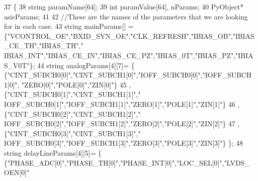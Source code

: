 \begin{DoxyCode}
37 \{
38     \textcolor{keywordtype}{string} paramName[64];
39     \textcolor{keywordtype}{int} paramValue[64], nParams;
40     PyObject* asicParams;
41  
42     \textcolor{comment}{//These are the names of the parameters that we are looking for in each case.}
43     \textcolor{keywordtype}{string} mainParams[] = \{\textcolor{stringliteral}{"VCONTROL\_OE"},\textcolor{stringliteral}{"BXID\_SYN\_OE"},\textcolor{stringliteral}{"CLK\_REFRESH"},\textcolor{stringliteral}{"IBIAS\_OB"},\textcolor{stringliteral}{"IBIAS\_CE\_TH"},\textcolor{stringliteral}{"IBIAS\_TH"},\textcolor{stringliteral}{"
      IBIAS\_INT"},\textcolor{stringliteral}{"IBIAS\_CE\_IN"},\textcolor{stringliteral}{"IBIAS\_CE\_PZ"},\textcolor{stringliteral}{"IBIAS\_0T"},\textcolor{stringliteral}{"IBIAS\_PZ"},\textcolor{stringliteral}{"IBIAS\_V0T"}\};
44     \textcolor{keywordtype}{string} analogParams[4][7]=      \{ \{\textcolor{stringliteral}{"CINT\_SUBCH0[0]"},\textcolor{stringliteral}{"CINT\_SUBCH1[0]"},\textcolor{stringliteral}{"IOFF\_SUBCH0[0]"},\textcolor{stringliteral}{"IOFF\_SUBCH1[0]"},\textcolor{stringliteral}{
      "ZERO[0]"},\textcolor{stringliteral}{"POLE[0]"},\textcolor{stringliteral}{"ZIN[0]"}\}
45                                                                 , \{\textcolor{stringliteral}{"CINT\_SUBCH0[1]"},\textcolor{stringliteral}{"CINT\_SUBCH1[1]"},\textcolor{stringliteral}{"
      IOFF\_SUBCH0[1]"},\textcolor{stringliteral}{"IOFF\_SUBCH1[1]"},\textcolor{stringliteral}{"ZERO[1]"},\textcolor{stringliteral}{"POLE[1]"},\textcolor{stringliteral}{"ZIN[1]"}\}
46                                                                 , \{\textcolor{stringliteral}{"CINT\_SUBCH0[2]"},\textcolor{stringliteral}{"CINT\_SUBCH1[2]"},\textcolor{stringliteral}{"
      IOFF\_SUBCH0[2]"},\textcolor{stringliteral}{"IOFF\_SUBCH1[2]"},\textcolor{stringliteral}{"ZERO[2]"},\textcolor{stringliteral}{"POLE[2]"},\textcolor{stringliteral}{"ZIN[2]"}\}
47                                                                 , \{\textcolor{stringliteral}{"CINT\_SUBCH0[3]"},\textcolor{stringliteral}{"CINT\_SUBCH1[3]"},\textcolor{stringliteral}{"
      IOFF\_SUBCH0[3]"},\textcolor{stringliteral}{"IOFF\_SUBCH1[3]"},\textcolor{stringliteral}{"ZERO[3]"},\textcolor{stringliteral}{"POLE[3]"},\textcolor{stringliteral}{"ZIN[3]"}\}             \};
48     \textcolor{keywordtype}{string} delayLineParams[4][5]= \{ \{\textcolor{stringliteral}{"PHASE\_ADC[0]"},\textcolor{stringliteral}{"PHASE\_TH[0]"},\textcolor{stringliteral}{"PHASE\_INT[0]"},\textcolor{stringliteral}{"LOC\_SEL[0]"},\textcolor{stringliteral}{"LVDS\_OEN[0]"}

\end{DoxyCode}
